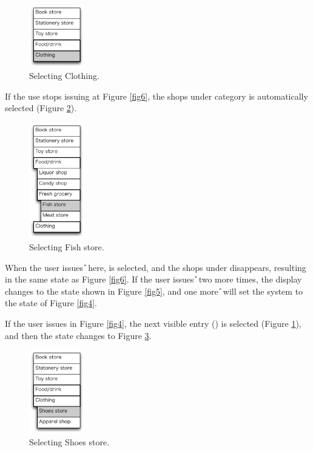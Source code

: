 \documentclass{article}
\begin{document}
\begin{figure}[H]
\centerline{\includegraphics[width=24mm,bb=0 0 139 157]{figures/fig8.pdf}}
\caption{Selecting Clothing.}
\label{fig8}
\end{figure}

If the use stops issuing {\D} at Figure \ref{fig6},
the shops under category  is automatically selected (Figure \ref{fig7}).

\begin{figure}[H]
\centerline{\includegraphics[width=24mm,bb=0 0 139 292]{figures/fig7.pdf}}
\caption{Selecting Fish store.}
\label{fig7}
\end{figure}

When the user issues {\U} here,  is selected,
and the shops under  disappears, 
resulting in the same state as Figure \ref{fig6}.
If the user issues {\U} two more times, the display changes to the state
shown in Figure \ref{fig5},
and one more {\U} will set the system to the state of Figure \ref{fig4}.

If the user issues {\D} in Figure \ref{fig4}, the next visible entry
() is selected (Figure \ref{fig8}), and then the state changes to Figure \ref{fig9}.

\begin{figure}[H]
\centerline{\includegraphics[width=24mm,bb=0 0 139 211]{figures/fig9.pdf}}
\caption{Selecting Shoes store.}
\label{fig9}
\end{figure}
\end{document}
